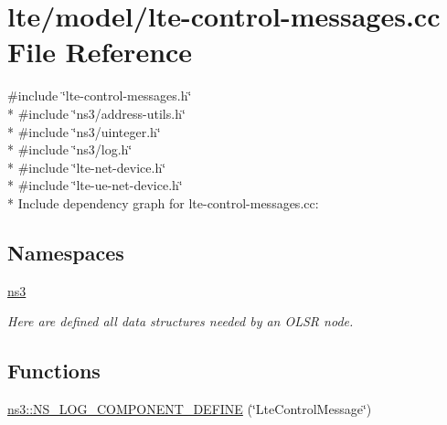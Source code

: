 \hypertarget{lte-control-messages_8cc}{}\section{lte/model/lte-\/control-\/messages.cc File Reference}
\label{lte-control-messages_8cc}
{\ttfamily \#include \char`\"{}lte-\/control-\/messages.\+h\char`\"{}}\\*
{\ttfamily \#include \char`\"{}ns3/address-\/utils.\+h\char`\"{}}\\*
{\ttfamily \#include \char`\"{}ns3/uinteger.\+h\char`\"{}}\\*
{\ttfamily \#include \char`\"{}ns3/log.\+h\char`\"{}}\\*
{\ttfamily \#include \char`\"{}lte-\/net-\/device.\+h\char`\"{}}\\*
{\ttfamily \#include \char`\"{}lte-\/ue-\/net-\/device.\+h\char`\"{}}\\*
Include dependency graph for lte-\/control-\/messages.cc\+:
\subsection*{Namespaces}
\begin{DoxyCompactItemize}
\item 
 \hyperlink{namespacens3}{ns3}
\begin{DoxyCompactList}\small\item\em Here are defined all data structures needed by an O\+L\+SR node. \end{DoxyCompactList}\end{DoxyCompactItemize}
\subsection*{Functions}
\begin{DoxyCompactItemize}
\item 
\hyperlink{namespacens3_a5a75fd39038c01f894ee7a40b4b0cd15}{ns3\+::\+N\+S\+\_\+\+L\+O\+G\+\_\+\+C\+O\+M\+P\+O\+N\+E\+N\+T\+\_\+\+D\+E\+F\+I\+NE} (\char`\"{}Lte\+Control\+Message\char`\"{})
\end{DoxyCompactItemize}
